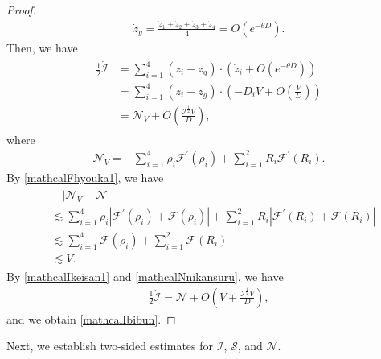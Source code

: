 \documentclass[10pt,a4paper]{amsart}
\numberwithin{equation}{section}
\begin{document}
\begin{proof}
\begin{align*}
\dot{z}_g
=\frac{\dot{z}_1+\dot{z}_2+\dot{z}_3+\dot{z}_4}{4}
=O\left(e^{-\theta D}\right).
\end{align*}
Then, we have
\begin{align}\label{mathcalIkeisan1}
\begin{aligned}
\frac{1}{2}\dot{\mathcal{I}}&=\sum_{i=1}^4\left(z_i-z_g\right)\cdot \left(\dot{z}_i+O\left(e^{-\theta D}\right)\right)
\\
&=\sum_{i=1}^4\left(z_i-z_g\right)\cdot\left(-D_iV+O\left(\frac{V}{D}\right)\right)
\\
&=\mathcal{N}_V+O\left(\frac{\mathcal{I}^{\frac{1}{2}}V}{D}\right),
\end{aligned}
\end{align}
where
\begin{align}\label{mathcalNVdef}
\mathcal{N}_V=-\sum_{i=1}^4\rho_i\mathcal{F}^{\prime}(\rho_i)+\sum_{i=1}^2R_i\mathcal{F}^{\prime}(R_i).
\end{align}
By \eqref{mathcalFhyouka1}, we have
\begin{align}\label{mathcalNnikansuru}
\begin{aligned}
&\quad \left|\mathcal{N}_V-\mathcal{N}\right|
\\
&\lesssim \sum_{i=1}^4\rho_i\left|\mathcal{F}^{\prime}(\rho_i)+\mathcal{F}(\rho_i)\right|+\sum_{i=1}^2R_i\left|\mathcal{F}^{\prime}(R_i)+\mathcal{F}(R_i)\right|
\\
&\lesssim \sum_{i=1}^4\mathcal{F}(\rho_i)+\sum_{i=1}^2\mathcal{F}(R_i)
\\
&\lesssim V.
\end{aligned}
\end{align}
By \eqref{mathcalIkeisan1} and \eqref{mathcalNnikansuru}, we have
\begin{align*}
\frac{1}{2}\dot{\mathcal{I}}=\mathcal{N}+O\left(V+\frac{\mathcal{I}^{\frac{1}{2}}V}{D}\right),
\end{align*}
and we obtain \eqref{mathcalIbibun}.
\end{proof}

Next, we establish two-sided estimates for $\mathcal{I}$, $\mathcal{S}$, and $\mathcal{N}$.
\end{document}
